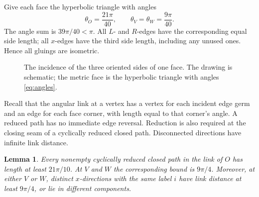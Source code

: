 \documentclass[11pt]{amsart}
\newtheorem{lemma}[theorem]{Lemma}
\theoremstyle{definition}
\theoremstyle{remark}
\numberwithin{equation}{section}
\begin{document}
Give each face the hyperbolic triangle with angles
\begin{equation}\label{eq:angles}
 \theta_O=\frac{21\pi}{40},\qquad
 \theta_V=\theta_W=\frac{9\pi}{40}.
\end{equation}
The angle sum is $39\pi/40<\pi$. All $L$- and $R$-edges have the
corresponding equal side length; all $x$-edges have the third side
length, including any unused ones. Hence all gluings are isometric.

\begin{figure}[ht]
\centering
{}
\caption{The incidence of the three oriented sides of one face.
The drawing is schematic; the metric face is the hyperbolic triangle
with angles \eqref{eq:angles}.}
\label{fig:triangle}
\end{figure}

Recall that the angular link at a vertex has a vertex for each
incident edge germ and an edge for each face corner, with length
equal to that corner's angle. A reduced path has no immediate edge
reversal. Reduction is also required at the closing seam of a
cyclically reduced closed path. Disconnected directions have infinite
link distance.

\begin{lemma}\label{lem:links}
Every nonempty cyclically reduced closed path in the link of $O$
has length at least $21\pi/10$. At $V$ and $W$ the corresponding
bound is $9\pi/4$. Moreover, at either $V$ or $W$, distinct
$x$-directions with the same label $i$ have link distance at least
$9\pi/4$, or lie in different components.
\end{lemma}
\end{document}
